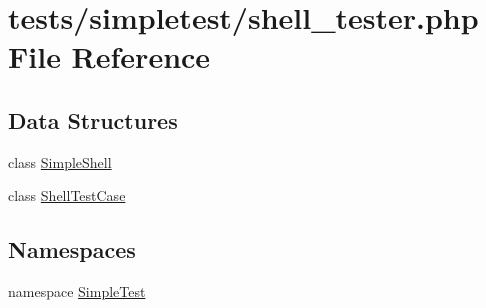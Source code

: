 \hypertarget{shell__tester_8php}{\section{tests/simpletest/shell\-\_\-tester.php File Reference}
\label{shell__tester_8php}
}
\subsection*{Data Structures}
\begin{DoxyCompactItemize}
\item 
class \hyperlink{class_simple_shell}{Simple\-Shell}
\item 
class \hyperlink{class_shell_test_case}{Shell\-Test\-Case}
\end{DoxyCompactItemize}
\subsection*{Namespaces}
\begin{DoxyCompactItemize}
\item 
namespace \hyperlink{namespace_simple_test}{Simple\-Test}
\end{DoxyCompactItemize}
